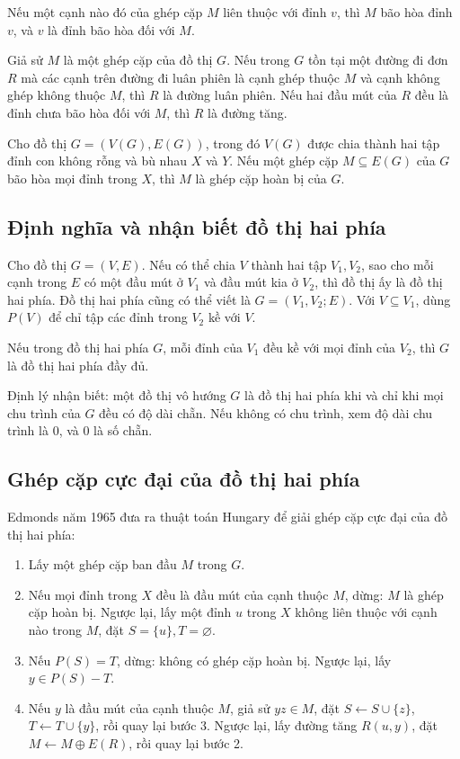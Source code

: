 \documentclass[11pt]{article}
\begin{document}
Nếu một cạnh nào đó của ghép cặp \(M\) liên thuộc với đỉnh \(v\), thì \(M\)
bão hòa đỉnh \(v\), và \(v\) là đỉnh bão hòa đối với \(M\).

Giả sử \(M\) là một ghép cặp của đồ thị \(G\). Nếu trong \(G\) tồn tại một
đường đi đơn \(R\) mà các cạnh trên đường đi luân phiên là cạnh ghép thuộc
\(M\) và cạnh không ghép không thuộc \(M\), thì \(R\) là đường luân phiên.
Nếu hai đầu mút của \(R\) đều là đỉnh chưa bão hòa đối với \(M\), thì \(R\)
là đường tăng.

Cho đồ thị \(G=(V(G),E(G))\), trong đó \(V(G)\) được chia thành hai tập đỉnh
con không rỗng và bù nhau \(X\) và \(Y\). Nếu một ghép cặp
\(M\subseteq E(G)\) của \(G\) bão hòa mọi đỉnh trong \(X\), thì \(M\) là
ghép cặp hoàn bị của \(G\).

\subsection*{Định nghĩa và nhận biết đồ thị hai phía}

Cho đồ thị \(G=(V,E)\). Nếu có thể chia \(V\) thành hai tập \(V_1,V_2\), sao
cho mỗi cạnh trong \(E\) có một đầu mút ở \(V_1\) và đầu mút kia ở \(V_2\),
thì đồ thị ấy là đồ thị hai phía. Đồ thị hai phía cũng có thể viết là
\(G=(V_1,V_2;E)\). Với \(V\subseteq V_1\), dùng \(P(V)\) để chỉ tập các đỉnh
trong \(V_2\) kề với \(V\).

Nếu trong đồ thị hai phía \(G\), mỗi đỉnh của \(V_1\) đều kề với mọi đỉnh
của \(V_2\), thì \(G\) là đồ thị hai phía đầy đủ.

Định lý nhận biết: một đồ thị vô hướng \(G\) là đồ thị hai phía khi và chỉ
khi mọi chu trình của \(G\) đều có độ dài chẵn. Nếu không có chu trình, xem
độ dài chu trình là \(0\), và \(0\) là số chẵn.

\subsection*{Ghép cặp cực đại của đồ thị hai phía}

Edmonds năm 1965 đưa ra thuật toán Hungary để giải ghép cặp cực đại của đồ
thị hai phía:
\begin{enumerate}
  \item Lấy một ghép cặp ban đầu \(M\) trong \(G\).
  \item Nếu mọi đỉnh trong \(X\) đều là đầu mút của cạnh thuộc \(M\), dừng:
  \(M\) là ghép cặp hoàn bị. Ngược lại, lấy một đỉnh \(u\) trong \(X\) không
  liên thuộc với cạnh nào trong \(M\), đặt \(S=\{u\},T=\varnothing\).
  \item Nếu \(P(S)=T\), dừng: không có ghép cặp hoàn bị. Ngược lại, lấy
  \(y\in P(S)-T\).
  \item Nếu \(y\) là đầu mút của cạnh thuộc \(M\), giả sử \(yz\in M\), đặt
  \(S\leftarrow S\cup\{z\}\), \(T\leftarrow T\cup\{y\}\), rồi quay lại bước
  3. Ngược lại, lấy đường tăng \(R(u,y)\), đặt
  \(M\leftarrow M\oplus E(R)\), rồi quay lại bước 2.
\end{enumerate}
\end{document}

